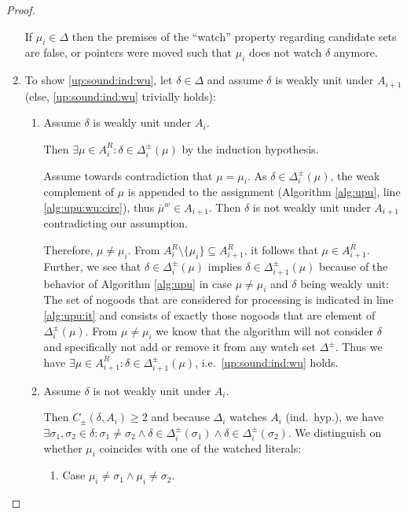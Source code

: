 \documentclass{vutinfth} %
\newcommand{\negweak}[1]{\overline{#1}^w}
\newcommand{\ass}{A}
\newcommand{\cdpm}{C_\pm}
\newcommand{\dpm}{\Delta^\pm}
\newcommand{\sgl}{\mu}
\newcommand{\bsgl}{\sigma}
\begin{document}
\begin{proof}
\begin{enumerate}
If $\sgl_i \in \Delta$ then the premises of the \enquote{watch} property regarding candidate sets are false, or pointers were moved such that $\sgl_i$ does not watch $\delta$ anymore.

\item To show \ref{up:sound:ind:wu}, let $\delta \in \Delta$ and assume $\delta$ is weakly unit under $\ass_{i+1}$ (else, \ref{up:sound:ind:wu} trivially holds):
\begin{enumerate}
	\item Assume $\delta$ is weakly unit under $\ass_i$. \label{pr:corr:wu:wu}
	
	Then $\exists \sgl \in \ass_i^R : \delta \in \Delta_i^\pm(\sgl)$ by the induction hypothesis. 
	
	Assume towards contradiction that $\sgl = \sgl_i$. As $\delta \in \dpm_i(\sgl)$, the weak complement of $\sgl$ is appended to the assignment (Algorithm \ref{alg:upu}, line \ref{alg:upu:wu:circ}), thus $\negweak{\sgl} \in A_{i+1}$. Then $\delta$ is not weakly unit under $A_{i+1}$ contradicting our assumption.
	
	Therefore, $\sgl \not = \sgl_i$. From $\ass_{i}^R \setminus \{ \sgl_i \} \subseteq \ass_{i+1}^R$, it follows that $\sgl \in \ass_{i+1}^R$. Further, we see that $\delta \in \dpm_{i}(\sgl)$ implies $\delta \in \Delta_{i+1}^\pm(\sgl)$ because of the behavior of Algorithm \ref{alg:upu} in case $\sgl \not = \sgl_i$ and $\delta$ being weakly unit: The set of nogoods that are considered for processing is indicated in line \ref{alg:upu:it} and consists of exactly those nogoods that are element of $\dpm_{i}(\sgl)$. From $\sgl \not = \sgl_i$ we know that the algorithm will not consider $\delta$ and specifically not add or remove it from any watch set $\dpm$. Thus we have $\exists \sgl \in \ass_{i+1}^R : \delta \in \dpm_{i+1}(\sgl)$, i.e.~\ref{up:sound:ind:wu} holds.
	\item Assume $\delta$ is not weakly unit under $A_i$.
	
	Then $\cdpm(\delta, \ass_{i}) \geq 2$ and because $\Delta_i$ watches $A_i$ (ind.~hyp.), we have $\exists \bsgl_1, \bsgl_2 \in \delta : \bsgl_1 \not = \bsgl_2 \wedge \delta \in \Delta_i^\pm(\bsgl_1) \wedge \delta \in \Delta_i^\pm(\bsgl_2)$. We distinguish on whether $\sgl_i$ coincides with one of the watched literals:

	\begin{enumerate}
		\item Case $\sgl_i \not = \bsgl_1 \wedge \sgl_i \not = \bsgl_2$.
		

\end{enumerate}
\end{enumerate}
\end{enumerate}
\end{proof}
\end{document}
